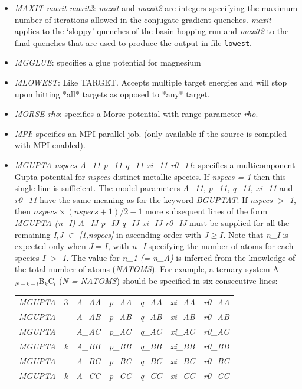 \documentclass[12pt,a4paper,dvips]{article}
\begin{document}
\begin{itemize}
\item {\it MAXIT maxit maxit2\/}: {\it maxit\/} and {\it maxit2\/} are integers specifying the
maximum number of iterations allowed in the conjugate gradient quenches. {\it maxit\/} applies
to the `sloppy' quenches of the basin-hopping run and {\it maxit2\/} to the final quenches
that are used to produce the output in file {\tt lowest}.

\item {\it MGGLUE\/}: specifies a glue potential for magnesium

\item {\it MLOWEST\/}: Like TARGET. Accepts multiple target energies and will stop upon hitting *all* targets as opposed to *any* target.

\item {\it MORSE rho\/}: specifies a Morse potential 
with range parameter {\it rho\/}.\cite{braierbw90,doyewb95,doyew96a}

\item {\it MPI\/}: specifies an MPI parallel job.
(only available if the source is compiled with MPI enabled).  

\item {\it MGUPTA nspecs A\_11 p\_11 q\_11 xi\_11 r0\_11\/}: specifies a multicomponent Gupta potential for {\it nspecs} distinct metallic species. If {\it nspecs = 1\/} then this single line is sufficient. The model parameters {\it A\_11\/}, {\it p\_11\/}, {\it q\_11\/}, {\it xi\_11\/} and {\it r0\_11\/} have the same meaning as for the keyword {\it BGUPTAT\/}. If {\it nspecs $>$ 1\/}, then $ nspecs \times (nspecs + 1)/2 - 1$ more subsequent lines of the form {\it MGUPTA (n\_I) A\_IJ p\_IJ q\_IJ xi\_IJ r0\_IJ \/} must be supplied for all the remaining {\it I,J $\in$ [1,nspecs] \/} in ascending order with $J \geq I$. Note that {\it n\_I\/} is expected only when $J = I$, with {\it n\_I\/} specifying the number of atoms for each species {\it I $>$ 1\/}. The value for {\it n\_1 (= n\_A)\/} is inferred from the knowledge of the total number of atoms ({\it NATOMS\/}). For example, a ternary system A$_{N-k-l}$B$_{k}$C$_{l}$  ({\it N = NATOMS\/}) should be specified in six consecutive lines: \\
\begin{tabular}{lllllll}
{\it MGUPTA} & 3 & {\it A\_AA} & {\it p\_AA} & {\it q\_AA} & {\it xi\_AA} & {\it r0\_AA} \\
{\it MGUPTA} &   & {\it A\_AB} & {\it p\_AB} & {\it q\_AB} & {\it xi\_AB} & {\it r0\_AB} \\
{\it MGUPTA} &   & {\it A\_AC} & {\it p\_AC} & {\it q\_AC} & {\it xi\_AC} & {\it r0\_AC} \\
{\it MGUPTA} & {\it k} & {\it A\_BB} & {\it p\_BB} & {\it q\_BB} & {\it xi\_BB} & {\it r0\_BB} \\
{\it MGUPTA} &   & {\it A\_BC} & {\it p\_BC} & {\it q\_BC} & {\it xi\_BC} & {\it r0\_BC} \\
{\it MGUPTA} & {\it k} & {\it A\_CC} & {\it p\_CC} & {\it q\_CC} & {\it xi\_CC} & {\it r0\_CC} \\
\end{tabular}


\end{itemize}
\end{document}
